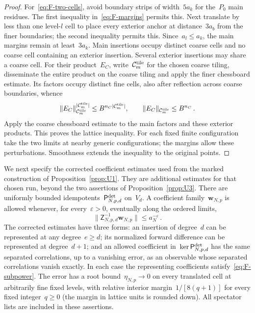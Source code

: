 \begin{proof}
For~\eqref{eq:F-two-cells}, avoid boundary strips of width~$5a_k$ for the~$P_0$ main residues. The first inequality in~\eqref{eq:F-margins} permits this. Next translate by less than one level-$l$ cell to place every exterior anchor at distance~$3a_b$ from the finer boundaries; the second inequality permits this. Since~$a_l\le a_k$, the main margins remain at least~$3a_k$. Main insertions occupy distinct coarse cells and no coarse cell containing an exterior insertion. Several exterior insertions may share a coarse cell. For their product~$E_C$, write~$\mathcal C_m^{\rm tile}$ for the chosen coarse tiling, disseminate the entire product on the coarse tiling and apply the finer chessboard estimate. Its factors occupy distinct fine cells, also after reflection across coarse boundaries, whence
\begin{equation*}
\|E_C\|_{\mathcal C_m^{\rm tile}}^{|\mathcal C_m^{\rm tile}|}\le B^{n_C|\mathcal C_m^{\rm tile}|},\qquad \|E_C\|_{\mathcal C_m^{\rm tile}}\le B^{n_C}\,.
\end{equation*}
Apply the coarse chessboard estimate to the main factors and these exterior products. This proves the lattice inequality. For each fixed finite configuration take the two limits at nearby generic configurations; the margins allow these perturbations. Smoothness extends the inequality to the original points.
\end{proof}

We next specify the corrected coefficient estimates used from the marked construction of Proposition~\ref{prop:U1}. They are additional estimates for that chosen run, beyond the two assertions of Proposition~\ref{prop:U3}. There are uniformly bounded idempotents~$\mathsf P^{\rm det}_{N,p,d}$ on~$V_d$. A coefficient family~$\mathbf w_{N,p}$ is allowed whenever, for every~$\varepsilon>0$, eventually along the ordered limits,
\begin{equation}\label{eq:F-subpower}
\|\mathsf Z_{N,p,d}^{-1}\mathbf w_{N,p}\|\le a_N^{-\varepsilon}\,.
\end{equation}
The corrected estimates have three forms: an insertion of degree~$d$ can be represented at any degree~$e\ge d$; its normalized forward difference can be represented at degree~$d+1$; and an allowed coefficient in~$\ker\mathsf P^{\rm det}_{N,p,d}$ has the same separated correlations, up to a vanishing error, as an observable whose separated correlations vanish exactly. In each case the representing coefficients satisfy~\eqref{eq:F-subpower}. The error has a root bound~$\eta_{N,p}\to0$ on every translated cell at arbitrarily fine fixed levels, with relative interior margin~$1/[8(q+1)]$ for every fixed integer~$q\ge0$ (the margin in lattice units is rounded down). All spectator lists are included in these assertions.

